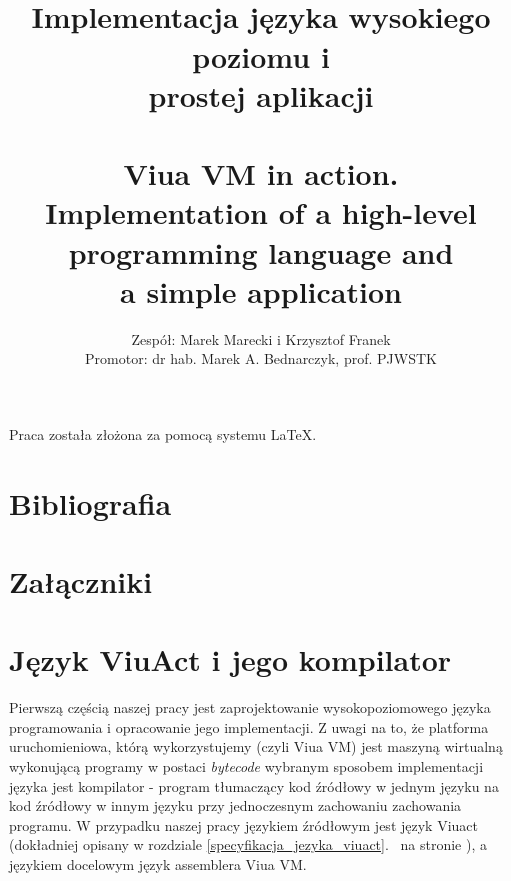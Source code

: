 \documentclass[11pt,oneside,a4paper,titlepage,onecolumn]{book}
\author{Zespół: Marek Marecki i Krzysztof Franek\\Promotor: dr hab. Marek A. Bednarczyk, prof. PJWSTK}
\title{%
    \inzmaintitlePL \\
    \large
    Implementacja języka wysokiego poziomu i \\
    prostej aplikacji\\
    ~\\
    Viua VM in action.\\
    Implementation of a high-level programming language and\\ a simple application}
\begin{document}

\maketitle

\tableofcontents
\listoffigures

Praca została złożona za pomocą systemu \LaTeX.

\newpage





















\chapter{Bibliografia}

\chapter{Załączniki}

\newpage  %

\chapter{Język ViuAct i jego kompilator}
\label{jezyk_viuact_i_jego_kompilator}

Pierwszą częścią naszej pracy jest zaprojektowanie wysokopoziomowego języka programowania i opracowanie jego
implementacji. Z uwagi na to, że platforma uruchomieniowa, którą wykorzystujemy (czyli Viua VM) jest maszyną
wirtualną wykonującą programy w postaci \emph{bytecode} wybranym sposobem implementacji języka jest
kompilator - program tłumaczący kod źródłowy w jednym języku na kod źródłowy w innym języku przy jednoczesnym
zachowaniu zachowania programu. W przypadku naszej pracy językiem źródłowym jest język Viuact (dokładniej
opisany w rozdziale \ref{specyfikacja_jezyka_viuact}.~ na stronie
\pageref{specyfikacja_jezyka_viuact}), a językiem docelowym język assemblera Viua VM.
\end{document}
